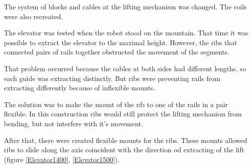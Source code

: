 \begin{enumerate*}

  \item The system of blocks and cables at the lifting mechanism was changed. %
  The coils were also recreated. %
  

  \item The elevator was tested when the robot stood on the mountain. That time it was possible to extract the elevator to the maximal height. However, the ribs that connected pairs of rails together obstructed the movement of the segments.

  That problem occurred because the cables at both sides had different lengths, so each guide was extracting distinctly. But ribs were preventing rails from extracting differently because of inflexible mounts.

  The solution was to make the mount of the rib to one of the rails in a pair flexible. In this construction ribs would still protect the lifting mechanism from bending, but not interfere with it's movement.

  \item After that, there were created flexible mounts for the ribs. These mounts allowed ribs to slide along the axis coincident with the direction od extracting of the lift (figure \ref{Elevator1400}, \ref{Elevator1500}).
  

\end{enumerate*}
